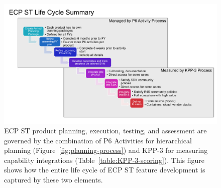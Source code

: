 \begin{figure}
	\centering
	\includegraphics[width=0.9\linewidth]{E4S-Lifecycle}
	\caption{ECP ST product planning, execution, testing, and assessment are governed by the combination of P6 Activities for hierarchical planning (Figure~\ref{fig:planning-process}) and KPP-3 for measuring capability integrations (Table~\ref{table:KPP-3-scoring}).  This figure shows how the entire life cycle of ECP ST feature development is captured by these two elements.}
	\label{fig:lifecycle}
    \protect{}
    \protect{}
\end{figure}

